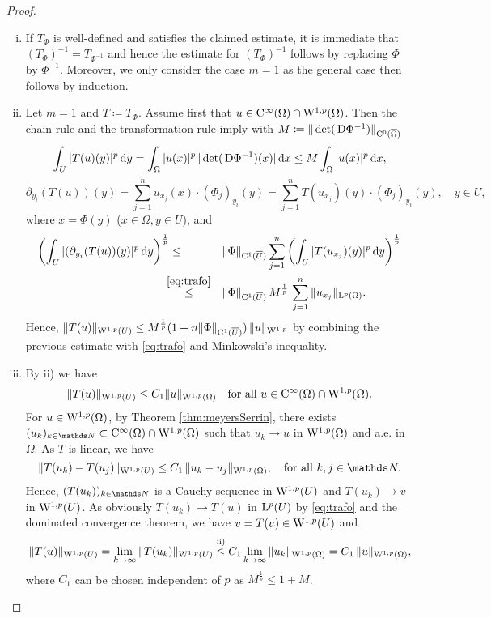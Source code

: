 \begin{proof}
  \begin{enumerate}[i)]
    \item If $T_\Phi$ is well-defined and satisfies the claimed estimate, it is immediate that $(T_\Phi)^{-1} = T_{\Phi^{-1}}$ and hence the estimate for $(T_\Phi)^{-1}$ follows by replacing $\Phi$ by $\Phi^{-1}$.
      Moreover, we only consider the case $m = 1$ as the general case then follows by induction.
    \item Let $m = 1$ and $T \coloneqq T_\Phi$.
      Assume first that $u \in \mathrm{C}^\infty(\Omega) \cap \mathrm{W}^{1,p}(\Omega)$.
      Then the chain rule and the transformation rule imply with $M \coloneqq \|\det(\,{\operatorname{D}} \Phi^{-1})\|_{\mathrm{C}^0(\overline{\Omega})}$
  \begin{equation}
    \label{eq:trafo}
    \int_U |T(u)(y)|^p \, {\operatorname{d}\!{y}}
     = \int_\Omega |u(x)|^p \, |\det(\,{\operatorname{D}} \Phi^{-1})(x)| \, {\operatorname{d}\!{x}}
    \leq M \int_\Omega |u(x)|^p \, {\operatorname{d}\!{x}},
  \end{equation}
  $$
  \partial_{y_i} (T(u))(y)
  = \sum_{j = 1}^n u_{x_j}(x) \cdot (\Phi_j)_{y_i}(y)
  = \sum_{j = 1}^n T(u_{x_j})(y) \cdot (\Phi_j)_{y_i}(y), \quad y \in U,
  $$
  where $x = \Phi(y)$ ($x \in \Omega, y \in U$), and
      \begin{alignat*}{2}
    \left( \int_U |(\partial_{y_i}(T(u))(y)|^p \, {\operatorname{d}\!{y}}\right)^{\frac{1}{p}}
        & \leq &&\|\Phi\|_{\mathrm{C}^1(\overline U)} \sum_{j = 1}^n \left( \int_U |T(u_{x_j})(y)|^p \, {\operatorname{d}\!{y}} \right)^{\frac{1}{p}} \\
        & \hspace{-0.5em}\overset{\eqref{eq:trafo}}{\leq} &&\|\Phi\|_{\mathrm{C}^1(\overline U)} \, M^{\frac{1}{p}} \, \sum_{j = 1}^n \|u_{x_j} \|_{\mathrm{L}^p(\Omega)}.
      \end{alignat*}
  Hence, $\|T(u)\|_{\mathrm{W}^{1,p}(U)} \leq M^{\frac{1}{p}} (1 + n\|\Phi\|_{\mathrm{C}^1(\overline U)}) \, \|u\|_{\mathrm{W}^{1,p}}$ by combining the previous estimate with \eqref{eq:trafo} and Minkowski's inequality.
\item By ii) we have
  $$
  \|T(u)\|_{\mathrm{W}^{1,p}(U)} \leq C_1 \|u\|_{\mathrm{W}^{1,p}(\Omega)} \quad \text{for all } u \in \mathrm{C}^\infty(\Omega) \cap \mathrm{W}^{1,p}(\Omega).
  $$
      For $u \in \mathrm{W}^{1,p}(\Omega)$, by Theorem \ref{thm:meyersSerrin}, there exists $(u_k)_{k \in \N} \subset \CC^\infty(\Omega) \cap \WW^{1,p}(\Omega)$ such that $u_k \to u$ in $\mathrm{W}^{1,p}(\Omega)$ and a.e. in $\Omega$.
  As $T$ is linear, we have
  $$
  \| T(u_k) - T(u_j)\|_{\WW^{1,p}(U)} \leq C_1 \, \|u_k - u_j\|_{\WW^{1,p}(\Omega)}, \quad\text{for all } k,j \in \N.
  $$
  Hence, $(T(u_k))_{k \in \N}$ is a Cauchy sequence in $\mathrm{W}^{1,p}(U)$ and $T(u_k) \to v$ in $\mathrm{W}^{1,p}(U)$.
  As obviously $T(u_k) \to T(u)$ in $\mathrm{L}^p(U)$ by \eqref{eq:trafo} and the dominated convergence theorem, we have $v = T(u) \in \mathrm{W}^{1,p}(U)$ and 
  $$
  \| T(u) \|_{\mathrm{W}^{1,p}(U)} 
  = \lim_{k \to \infty} \|T(u_k)\|_{\mathrm{W}^{1,p}(U)}
      \overset{\text{ii)}}\leq C_1 \lim_{k \to \infty} \|u_k\|_{\mathrm{W}^{1,p}(\Omega)}
  = C_1 \, \|u\|_{\mathrm{W}^{1,p}(\Omega)},
  $$
  where $C_1$ can be chosen independent of $p$ as $M^{\frac{1}{p}} \leq 1 + M$. \qedhere
  \end{enumerate}
\end{proof}

